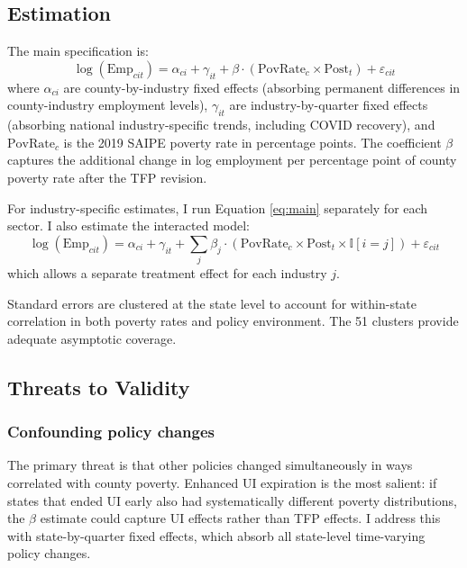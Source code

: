 \documentclass[12pt]{article}
\newcommand{\ind}{\mathbb{I}}
\begin{document}
\subsection{Estimation}

The main specification is:
\begin{equation}
\log(\text{Emp}_{cit}) = \alpha_{ci} + \gamma_{it} + \beta \cdot (\text{PovRate}_c \times \text{Post}_t) + \varepsilon_{cit}
\label{eq:main}
\end{equation}
where $\alpha_{ci}$ are county-by-industry fixed effects (absorbing permanent differences in county-industry employment levels), $\gamma_{it}$ are industry-by-quarter fixed effects (absorbing national industry-specific trends, including COVID recovery), and $\text{PovRate}_c$ is the 2019 SAIPE poverty rate in percentage points. The coefficient $\beta$ captures the additional change in log employment per percentage point of county poverty rate after the TFP revision.

For industry-specific estimates, I run Equation \ref{eq:main} separately for each sector. I also estimate the interacted model:
\begin{equation}
\log(\text{Emp}_{cit}) = \alpha_{ci} + \gamma_{it} + \sum_j \beta_j \cdot (\text{PovRate}_c \times \text{Post}_t \times \ind[i = j]) + \varepsilon_{cit}
\end{equation}
which allows a separate treatment effect for each industry $j$.

Standard errors are clustered at the state level to account for within-state correlation in both poverty rates and policy environment. The 51 clusters provide adequate asymptotic coverage.

\subsection{Threats to Validity}

\subsubsection*{Confounding policy changes} The primary threat is that other policies changed simultaneously in ways correlated with county poverty. Enhanced UI expiration is the most salient: if states that ended UI early also had systematically different poverty distributions, the $\beta$ estimate could capture UI effects rather than TFP effects. I address this with state-by-quarter fixed effects, which absorb all state-level time-varying policy changes.
\end{document}
